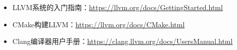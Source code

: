 
\begin{itemize}
\item
LLVM系统的入门指南：\url{https://llvm.org/docs/GettingStarted.html}

\item
CMake构建LLVM：\url{https://llvm.org/docs/CMake.html}

\item
Clang编译器用户手册：\url{https://clang.llvm.org/docs/UsersManual.html}
\end{itemize}
